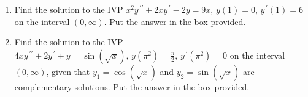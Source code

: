 \documentclass{ximera}
\begin{document}
\begin{enumerate}
\begin{enumerate}


\vfill


\newpage


\item $(x-1)y^{\,\prime\prime}-xy^{\,\prime}+y=2(x-1)^2e^x$ given that $y_1=x$ and $y_2=e^x$ are complementary solutions.


















\vfill

\end{enumerate}


\newpage

\item Find the solution to the IVP $x^2 y^{\,\prime\prime}+2xy^{\,\prime}-2y=9x$, $y(1)=0$, $y^{\,\prime}(1)=6$ on the interval $(0,\infty)$. Put the answer in the box provided.











\hfill{}

\newpage

\item Find the solution to the IVP \\$4x y^{\,\prime\prime}+2y^{\,\prime}+y=\sin{(\sqrt{x})}$, $y(\pi^2)=\frac{\pi}{2}$, $y^{\,\prime}(\pi^2)=0$ on the interval $(0,\infty)$, given that $y_1=\cos{(\sqrt{x})}$ and $y_2=\sin{(\sqrt{x})}$ are complementary solutions. Put the answer in the box provided.\\



\end{enumerate}
\end{document}
